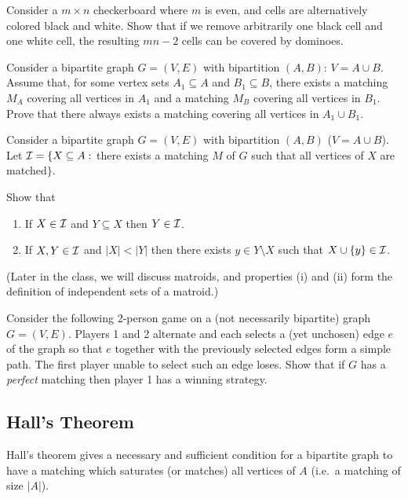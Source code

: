 \documentclass[12pt]{article}
\begin{document}
\begin{exercises}
\item
Consider a $m\times n$ checkerboard where $m$ is even, and cells are alternatively colored black and white. Show that if we remove arbitrarily one black cell and one white cell, the resulting $mn-2$ cells can be covered by dominoes. 

\item
Consider a bipartite graph $G=(V,E)$ with bipartition $(A,B)$: $V=A
\cup B$. Assume that, for some vertex sets $A_1\subseteq A$ and $B_1
\subseteq B$, there exists a matching $M_A$ covering all vertices in
$A_1$ and a matching $M_B$ covering all vertices in $B_1$. Prove that
there always exists a matching covering all vertices in $A_1\cup
B_1$.

\item
Consider a bipartite graph $G=(V,E)$ with bipartition $(A,B)$
($V=A\cup B$). Let ${\cal I}=\{X\subseteq A:$ there exists a matching
$M$ of $G$ such that all vertices of $X$ are matched$\}$. 

Show that 
\begin{enumerate}
\item
If $X\in {\cal I}$ and $Y\subseteq X$ then $Y\in {\cal I}$.
\item
If $X, Y\in {\cal I}$ and $|X|<|Y|$ then there exists $y\in Y\setminus
X$ such that $X\cup\{y\}\in {\cal I}$. 
\end{enumerate}
(Later in the class, we will discuss matroids, and properties (i) and
(ii) form the definition of independent sets of a matroid.)
 
\item
Consider the following 2-person game on a (not necessarily bipartite)
graph $G=(V,E)$. Players 1 and 2 alternate and each selects a (yet
unchosen) edge $e$ of the graph so that $e$ together with the
previously selected edges form a simple path. The first player unable
to select such an edge loses. Show that if $G$ has a {\it perfect}
matching then player 1 has a winning strategy. 

\end{exercises}

\subsection{Hall's Theorem}

Hall's theorem gives a necessary and sufficient condition for a
bipartite graph to have a matching which saturates (or matches) all
vertices of $A$ (i.e.~a matching of size $|A|$).
\end{document}
